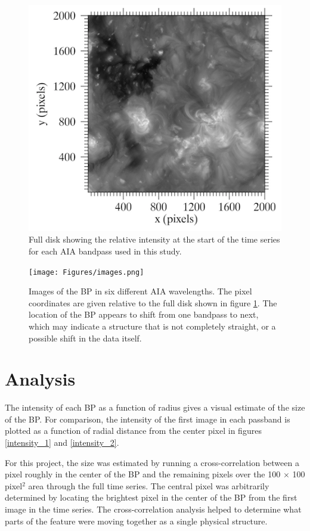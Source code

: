 \documentclass[preprint2]{aastex}
\begin{document}
\begin{figure}[htb!]
    \includegraphics[width=\textwidth]{Figures/full.png}
    \caption{Full disk showing the relative intensity at the start of the time
        series for each AIA bandpass used in this study.}
    \label{full}
\end{figure}

\begin{figure}[htb!]
    \texttt{[image: Figures/images.png]}
    \caption{Images of the BP in six different AIA wavelengths. The pixel coordinates
        are given relative to the full disk shown in figure \ref{full}.
        The location of the BP appears to shift from one bandpass to next, which
        may indicate a structure that is not completely straight, or a possible shift
        in the data itself.}
    \label{bp_images}
\end{figure}

\section{Analysis}\label{analysis}
The intensity of each BP as a function of radius gives a visual estimate
of the size of the BP. For comparison, the intensity of the first image in each
passband is plotted as a function of radial distance from the center pixel in figures
\ref{intensity_1} and \ref{intensity_2}.

For this project, the size was estimated by running a cross-correlation between
a pixel roughly in the center of the BP and the remaining pixels over the
100 $\times$ 100 pixel$^{2}$ area through the full time series.
The central pixel was arbitrarily determined by locating the brightest pixel in the center
of the BP from the first image in the time series. The cross-correlation analysis
helped to determine what parts of the feature were moving together as a single
physical structure.
\end{document}
